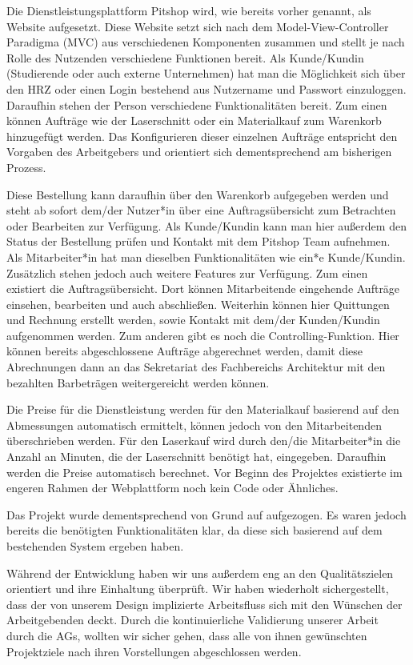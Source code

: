 \documentclass[
ngerman,
accentcolor=2d,
marginpar=false,
class=report,
fontsize=11pt,
ruledheaders=section,
]{tudapub}
\begin{document}
	    Die Dienstleistungsplattform Pitshop wird, wie bereits vorher genannt, als Website aufgesetzt. Diese Website setzt sich nach dem Model-View-Controller Paradigma (MVC) aus verschiedenen Komponenten zusammen und stellt je nach Rolle des Nutzenden verschiedene Funktionen bereit. Als Kunde/Kundin (Studierende oder auch externe Unternehmen) hat man die Möglichkeit sich über den HRZ oder einen Login bestehend aus Nutzername und Passwort einzuloggen. Daraufhin stehen der Person verschiedene Funktionalitäten bereit. Zum einen können Aufträge wie der Laserschnitt oder ein Materialkauf zum Warenkorb hinzugefügt werden. Das Konfigurieren dieser einzelnen Aufträge entspricht den Vorgaben des Arbeitgebers und orientiert sich dementsprechend am bisherigen Prozess.

	    Diese Bestellung kann daraufhin über den Warenkorb aufgegeben werden und steht ab sofort dem/der Nutzer*in über eine Auftragsübersicht zum Betrachten oder Bearbeiten zur Verfügung. Als Kunde/Kundin kann man hier außerdem den Status der Bestellung prüfen und Kontakt mit dem Pitshop Team aufnehmen. Als Mitarbeiter*in hat man dieselben Funktionalitäten wie ein*e Kunde/Kundin. Zusätzlich stehen jedoch auch weitere Features zur Verfügung. Zum einen existiert die Auftragsübersicht. Dort können Mitarbeitende eingehende Aufträge einsehen, bearbeiten und auch abschließen. Weiterhin können hier Quittungen und Rechnung erstellt werden, sowie Kontakt mit dem/der Kunden/Kundin aufgenommen werden. Zum anderen gibt es noch die Controlling-Funktion. Hier können bereits abgeschlossene Aufträge abgerechnet werden, damit diese Abrechnungen dann an das Sekretariat des Fachbereichs Architektur mit den bezahlten Barbeträgen weitergereicht werden können.

	    Die Preise für die Dienstleistung werden für den Materialkauf basierend auf den Abmessungen automatisch ermittelt, können jedoch von den Mitarbeitenden überschrieben werden. Für den Laserkauf wird durch den/die Mitarbeiter*in die Anzahl an Minuten, die der Laserschnitt benötigt hat, eingegeben. Daraufhin werden die Preise automatisch berechnet. Vor Beginn des Projektes existierte im engeren Rahmen der Webplattform noch kein Code oder Ähnliches.

	    Das Projekt wurde dementsprechend von Grund auf aufgezogen. Es waren jedoch bereits die benötigten Funktionalitäten klar, da diese sich basierend auf dem bestehenden System ergeben haben.

	    Während der Entwicklung haben wir uns außerdem eng an den Qualitätszielen orientiert und ihre Einhaltung überprüft. Wir haben wiederholt sichergestellt,
	    dass der von unserem Design implizierte Arbeitsfluss sich mit den Wünschen der Arbeitgebenden deckt. Durch die kontinuierliche Validierung unserer
	    Arbeit durch die AGs, wollten wir sicher gehen, dass alle von ihnen gewünschten Projektziele nach ihren Vorstellungen abgeschlossen werden.
\end{document}
